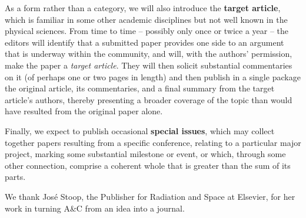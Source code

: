 As a form rather than a category, we will also introduce the
\textbf{target article}, which is familiar in some other academic
disciplines but not well known in the physical sciences. From time to time -- possibly
only once or twice a year -- the editors will identify that a submitted paper 
provides one side to an argument that is underway within the community, and will,
with the authors' permission, make the paper a {\em target article\/}. They will then solicit 
substantial commentaries on it (of perhaps one or two pages in length) and then 
publish in a single package the original article, its commentaries, and a final summary
from the target article's authors, thereby presenting a broader coverage of the topic
than would have resulted from the original paper alone.  

Finally, we expect to publish occasional \textbf{special issues}, which may collect together
papers resulting from a specific conference, relating to a particular major project, marking some 
substantial milestone or event, or which, through some other connection, comprise a coherent whole 
that is greater than the sum of its parts.  



\acknowledgements We thank Jos{\'e} Stoop, the Publisher for Radiation and Space at Elsevier, for her work in turning A\&C from an idea into a journal.





